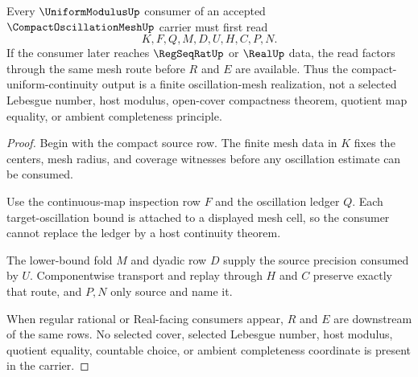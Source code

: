 \begin{theorem}
\label{thm:compact-oscillation-mesh-uniform-modulus-route}
Every $\UniformModulusUp$ consumer of an accepted $\CompactOscillationMeshUp$ carrier must first read
$$
K,F,Q,M,D,U,H,C,P,N .
$$
If the consumer later reaches $\RegSeqRatUp$ or $\RealUp$ data, the read factors through the same mesh route before $R$ and $E$ are available. Thus the compact-uniform-continuity output is a finite oscillation-mesh realization, not a selected Lebesgue number, host modulus, open-cover compactness theorem, quotient map equality, or ambient completeness principle.
\end{theorem}
\begin{proof}
Begin with the compact source row. The finite mesh data in $K$ fixes the centers, mesh radius, and coverage witnesses before any oscillation estimate can be consumed.

Use the continuous-map inspection row $F$ and the oscillation ledger $Q$. Each target-oscillation bound is attached to a displayed mesh cell, so the consumer cannot replace the ledger by a host continuity theorem.

The lower-bound fold $M$ and dyadic row $D$ supply the source precision consumed by $U$. Componentwise transport and replay through $H$ and $C$ preserve exactly that route, and $P,N$ only source and name it.

When regular rational or Real-facing consumers appear, $R$ and $E$ are downstream of the same rows. No selected cover, selected Lebesgue number, host modulus, quotient equality, countable choice, or ambient completeness coordinate is present in the carrier.
\end{proof}



